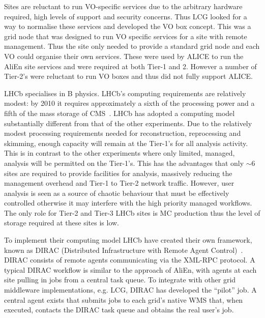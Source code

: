 Sites are reluctant to run VO-specific services due to the arbitrary hardware required, high levels of support and security concerns. Thus LCG looked for a way to normalise these services and developed the VO box concept. This was a grid node that was designed to run VO specific services for a site with remote management. Thus the site only needed to provide a standard grid node and each VO could organise their own services. These were used by ALICE to run the AliEn site services and were required at both Tier-1 and 2. However a number of Tier-2's were reluctant to run VO boxes and thus did not fully support ALICE.


LHCb specialises in B physics. LHCb's computing requirements are relatively modest: by 2010 it requires approximately a sixth of the processing power and a fifth of the mass storage of CMS~\cite{LCG_TDR}. LHCb has adopted a computing model substantially different from that of the other experiments. Due to the relatively modest processing requirements needed for reconstruction, reprocessing and skimming, enough capacity will remain at the Tier-1's for all analysis activity. This is in contrast to the other experiments where only limited, managed, analysis will be permitted on the Tier-1's. This has the advantages that only $\sim$6 sites are required to provide facilities for analysis, massively reducing the management overhead and Tier-1 to Tier-2 network traffic. However, user analysis is seen as a source of chaotic behaviour that must be effectively controlled otherwise it may interfere with the high priority managed workflows. The only role for Tier-2 and Tier-3 LHCb sites is MC production thus the level of storage required at these sites is low.

To implement their computing model LHCb have created their own framework, known as DIRAC (Distributed Infrastructure with Remote Agent Control)~\cite{citeulike:912522}. DIRAC consists of remote agents communicating via the XML-RPC protocol. A typical DIRAC workflow is similar to the approach of AliEn, with agents at each site pulling in jobs from a central task queue. To integrate with other grid middleware implementations, e.g. LCG,  DIRAC has developed the ``pilot'' job. A central agent exists that submits jobs to each grid's native WMS that, when executed, contacts the DIRAC task queue and obtains the real user's job. 

